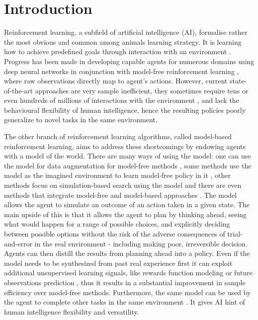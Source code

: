 \section{Introduction}

Reinforcement learning, a subfield of artificial intelligence (AI), formalise rather the most obvious and common among animals learning strategy. It is learning how to achieve predefined goals through interaction with an environment \cite{Book.RLAI}. Progress has been made in developing capable agents for numerous domains using deep neural networks in conjunction with model-free reinforcement learning \cite{Algo.Rainbow}\cite{Algo.A3C}\cite{Algo.PPO}, where raw observations directly map to agent's actions. However, current state-of-the-art approaches are very sample inefficient, they sometimes require tens or even hundreds of millions of interactions with the environment \cite{Benchmark.RevisitingALE}, and lack the behavioural flexibility of human intelligence, hence the resulting policies poorly generalize to novel tasks in the same environment.

The other branch of reinforcement learning algorithms, called model-based reinforcement learning, aims to address these shortcomings by endowing agents with a model of the world. There are many ways of using the model: one can use the model for data augmentation for model-free methods \cite{Algo.MBVE}, some methods use the model as the imagined environment to learn model-free policy in it \cite{Algo.WorldModels}, other methods focus on simulation-based search using the model \cite{Algo.AlphaZero} and there are even methods that integrate model-free and model-based approaches \cite{Algo.I2A}. The model allows the agent to simulate an outcome of an action taken in a given state. The main upside of this is that it allows the agent to plan by thinking ahead, seeing what would happen for a range of possible choices, and explicitly deciding between possible options without the risk of the adverse consequences of trial-and-error in the real environment - including making poor, irreversible decision. Agents can then distill the results from planning ahead into a policy. Even if the model needs to be synthesized from past real experience first it can exploit additional unsupervised learning signals, like rewards function modeling or future observations prediction \cite{Algo.AuxiliaryTasks}, thus it results in a substantial improvement in sample efficiency over model-free methods. Furthermore, the same model can be used by the agent to complete other tasks in the same environment \cite{Algo.I2A}. It gives AI hint of human intelligence flexibility and versatility.

